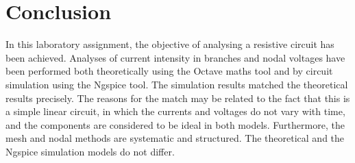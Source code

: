 \section{Conclusion}
\label{sec:conclusion}

In this laboratory assignment, the objective of analysing a resistive circuit has been
achieved. Analyses of current intensity in branches and nodal voltages have been performed both
theoretically using the Octave maths tool and by circuit simulation using the
Ngspice tool. The simulation results matched the theoretical results
precisely. 
The reasons for the match may be related to the fact that this is a
simple linear circuit, in which the currents and voltages do not vary with time, and
the components are considered to be ideal in both models. Furthermore, the mesh and 
nodal methods are systematic and structured. The theoretical and the Ngspice 
simulation models do not differ.






